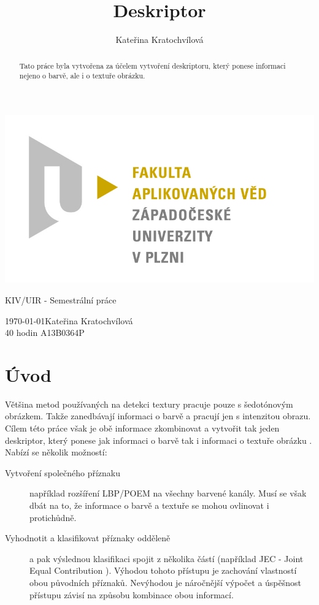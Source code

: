 \documentclass{report}
\title{Deskriptor}
\author{Kateřina Kratochvílová}
\begin{document}
 
\shorthandoff{-}
\begin{titlepage}
	\begin{flushleft} 
		{\includegraphics[width=.5\textwidth]{./img/fav_logo.jpg}\\[3cm]}
	\end{flushleft}
	\vspace{1.5cm}
	\begin{center}
		{\Huge KIV/UIR - Semestrální práce}
	\end{center}
	\vfill
	{\normalsize 
		\today \hfill Kateřina Kratochvílová \\
		40 hodin \hfill A13B0364P \\
	}

\end{titlepage}


\tableofcontents

\thispagestyle{empty} %

\begin{abstract}
Tato práce byla vytvořena za účelem vytvoření deskriptoru, který ponese informaci nejeno o barvě, ale i o textuře obrázku. 
\end{abstract}

\chapter{Úvod}
Většina metod používaných na detekci textury pracuje pouze s šedotónovým obrázkem. Takže zanedbávají informaci o barvě a pracují jen s intenzitou obrazu. Cílem této práce však je obě informace zkombinovat a vytvořit tak jeden deskriptor, který ponese jak informaci o barvě tak i informaci o textuře obrázku \cite{DiplomovaBrno}. Nabízí se několik možností: 

\begin{description}
\item[Vytvoření společného příznaku] 
například rozšíření LBP/POEM na všechny barvené kanály. Musí se však dbát na to, že informace o barvě a textuře se mohou ovlinovat i protichůdně. 

\item[Vyhodnotit a klasifikovat příznaky odděleně] 
a pak výslednou klasifikaci spojit z několika částí (například JEC - Joint Equal Contribution \cite{JEC} ). Výhodou tohoto přístupu je zachování vlastností obou původních příznaků. Nevýhodou je náročnější výpočet a úspěšnost přístupu závisí na způsobu kombinace obou informací.
\end{description} 
\end{document}
